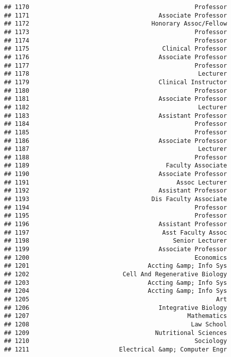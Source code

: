 \documentclass[
]{article}
\begin{document}
\begin{verbatim}
## 1170                                              Professor
## 1171                                    Associate Professor
## 1172                                  Honorary Assoc/Fellow
## 1173                                              Professor
## 1174                                              Professor
## 1175                                     Clinical Professor
## 1176                                    Associate Professor
## 1177                                              Professor
## 1178                                               Lecturer
## 1179                                    Clinical Instructor
## 1180                                              Professor
## 1181                                    Associate Professor
## 1182                                               Lecturer
## 1183                                    Assistant Professor
## 1184                                              Professor
## 1185                                              Professor
## 1186                                    Associate Professor
## 1187                                               Lecturer
## 1188                                              Professor
## 1189                                      Faculty Associate
## 1190                                    Associate Professor
## 1191                                         Assoc Lecturer
## 1192                                    Assistant Professor
## 1193                                  Dis Faculty Associate
## 1194                                              Professor
## 1195                                              Professor
## 1196                                    Assistant Professor
## 1197                                     Asst Faculty Assoc
## 1198                                        Senior Lecturer
## 1199                                    Associate Professor
## 1200                                              Economics
## 1201                                 Accting &amp; Info Sys
## 1202                          Cell And Regenerative Biology
## 1203                                 Accting &amp; Info Sys
## 1204                                 Accting &amp; Info Sys
## 1205                                                    Art
## 1206                                    Integrative Biology
## 1207                                            Mathematics
## 1208                                             Law School
## 1209                                   Nutritional Sciences
## 1210                                              Sociology
## 1211                         Electrical &amp; Computer Engr

\end{verbatim}
\end{document}
